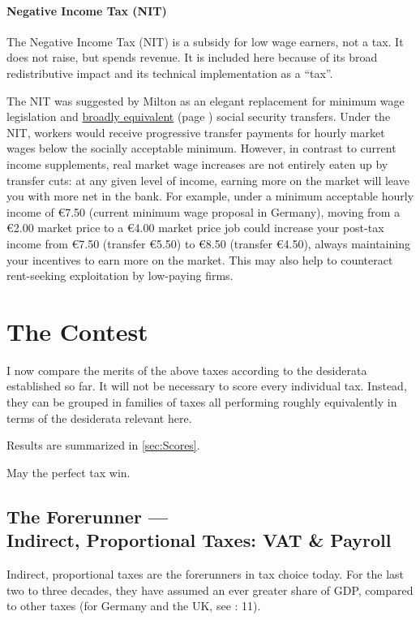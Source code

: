 \paragraph{Negative Income Tax (NIT)}  \label{sec:NIT} The Negative Income Tax (NIT) is a subsidy for low wage earners, not a tax. It does not raise, but spends revenue. It is included here because of its broad redistributive impact and its technical implementation as a ``tax''.

The NIT was suggested by Milton \cite{Friedman1962} as an elegant replacement for minimum wage legislation and \hyperref[sec:StructuralUnemployment]{broadly equivalent} (page \pageref{sec:StructuralUnemployment}) social security transfers. Under the NIT, workers would receive progressive transfer payments for hourly market wages below the socially acceptable minimum. However, in contrast to current income supplements, real market wage increases are not entirely eaten up by transfer cuts: at any given level of income, earning more on the market will leave you with more net in the bank. For example, under a minimum acceptable hourly income of \euro{}7.50 (current minimum wage proposal in Germany), moving from a \euro{}2.00 market price to a \euro{}4.00 market price job could increase your post-tax income from \euro{}7.50 (transfer \euro{}5.50) to \euro{}8.50 (transfer \euro{}4.50), always maintaining your incentives to earn more on the market. This may also help to counteract rent-seeking exploitation by low-paying firms.

\section{The Contest} \label{sec:contest} I now compare the merits of the above taxes according to the desiderata established so far. It will not be necessary to score every individual tax. Instead, they can be grouped in families of taxes all performing roughly equivalently in terms of the desiderata relevant here.

Results are summarized in \autoref{sec:Scores}.

May the perfect tax win.

\subsection[Indirect, Proportional Taxes]{The Forerunner ---\\Indirect, Proportional Taxes: VAT \& Payroll} \label{sec:ScoreVAT} Indirect, proportional taxes are the forerunners in tax choice today. For the last two to three decades, they have assumed an ever greater share of GDP, compared to other taxes (for Germany and the UK, see \citealt{Kemmerling2009}: 11).

